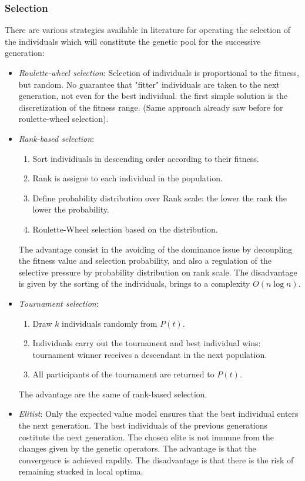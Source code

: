 \documentclass{article}
\begin{document}
\subsubsection{Selection}
There are various strategies available in literature for operating the selection of the individuals
which will constitute the genetic pool for the successive generation:
\begin{itemize}
    \item \textit{Roulette-wheel selection}:
          Selection of individuals is proportional to the fitness, but random.
          No guarantee that "fitter" individuals are taken to the next generation, not even
          for the best individual. the first simple solution is the discretization of the fitness range.
          (Same approach already saw before for roulette-wheel selection).


    \item \textit{Rank-based selection}:
          \begin{enumerate}
              \item Sort individiuals in descending order according to their fitness.
              \item Rank is assigne to each individual in the population.
              \item Define probability distribution over Rank scale: the lower the rank
                    the lower the probability.
              \item Roulette-Wheel selection based on the distribution.
          \end{enumerate}
          The advantage consist in the avoiding of the dominance issue by decoupling the fitness
          value and selection probability, and also a regulation of the selective
          pressure by probability distribution on rank scale. The disadvantage is given
          by the sorting of the individuals, brings to a complexity $O(n\log n)$.
    \item \textit{Tournament selection}:
          \begin{enumerate}
              \item Draw $k$ individuals randomly from $P(t)$.
              \item Individuals carry out the tournament and best individual wins:
                    tournament winner receives a descendant in the next population.
              \item All participants of the tournament are returned to $P(t)$.
          \end{enumerate}
          The advantage are the same of rank-based selection.
    \item \textit{Elitist}: Only the expected value model ensures that the best individual
          enters the next generation. The best individuals of the previous generations
          costitute the next generation. The chosen elite is not immune from the changes
          given by the genetic operators. The advantage is that the convergence is achieved
          rapdily. The disadvantage is that there is the risk of remaining stucked in local optima.



\end{itemize}
\end{document}
